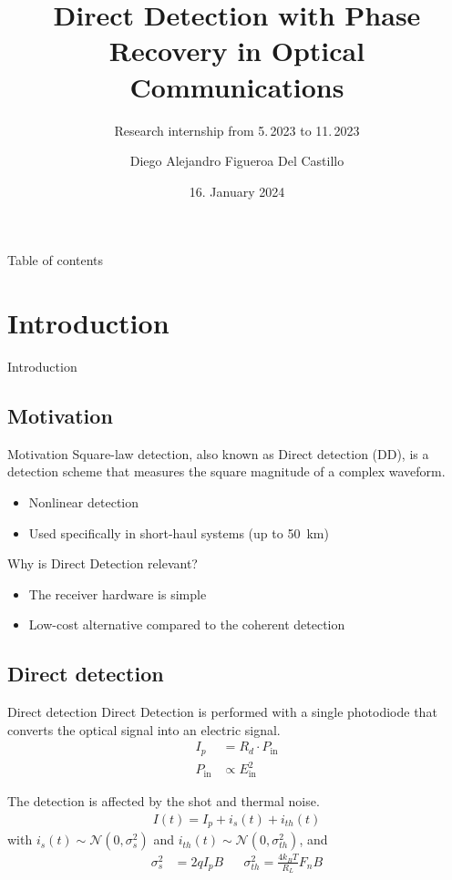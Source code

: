 \documentclass[en]{sdqbeamer}
\title[Research internship]{Direct Detection with Phase Recovery in Optical Communications}
\subtitle{Research internship from 5.\,2023 to 11.\,2023}
\author[Diego Figueroa]{Diego Alejandro Figueroa Del Castillo }
\date[16.\,1.\,2024]{16. January 2024}
\begin{document}
 
\KITtitleframe

\begin{frame}[allowframebreaks]{Table of contents}
\tableofcontents[sections={1-2}]
    \framebreak
  \tableofcontents[sections={3-4}]
\end{frame}



\section{Introduction}

\begin{frame}{}{}
\center\Huge Introduction
\end{frame}

\subsection{Motivation}

\begin{frame}{Motivation}{}
Square-law detection, also known as Direct detection (DD), is a detection scheme that measures the square magnitude of a complex waveform.
\begin{itemize}
\item Nonlinear detection
\item Used specifically in short-haul systems (up to \SI{50}{\km})
\end{itemize}

\begin{greenblock}{Why is Direct Detection relevant?}
	\begin{itemize}
\item The receiver hardware is simple
\item Low-cost alternative compared to the coherent detection
\end{itemize}
\end{greenblock}
\end{frame}


\subsection{Direct detection}
\begin{frame}{Direct detection}{}
Direct Detection is performed with a single photodiode that converts the optical signal into an electric signal. 
\begin{align}
I_p&=R_d\cdot P_\text{in}\\
 P_\text{in}&\propto E_\text{in}^2
\end{align}

The detection is affected by the shot and thermal noise.
\begin{align}
I(t) = I_p+i_s(t)+i_{th}(t)
\end{align}
with $i_s(t)\sim\mathcal{N}(0,\sigma_s^2)$ and $i_{th}(t)\sim\mathcal{N}(0,\sigma_{th}^2)$, and 
\begin{align}
\sigma_s^2 &= 2qI_pB &&\sigma_{th}^2 = \frac{4k_BT}{R_L} F_nB
\end{align}
\end{frame}
\end{document}
